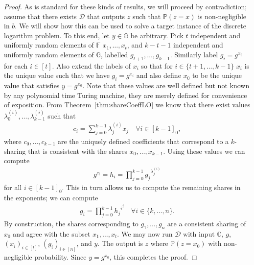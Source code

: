 \documentclass{article}
\newcommand{\seq}[1]{\left[#1\right]}
\newcommand{\seqZ}[1]{\left[#1\right]_0}
\theoremstyle{remark}
\newcommand{\F}{\mathbb{F}}
\newcommand{\G}{\mathbb{G}}
\renewcommand{\P}{\mathbb{P}}
\begin{document}
\begin{proof}
	As is standard for these kinds of results, we will proceed by
	contradiction; assume that there exists $\mathcal{D}$ that outputs $z$ such
	that $\P(z = x)$ is non-negligible in $b$. We will show how this can be
	used to solve a target instance of the discrete logarithm problem. To this
	end, let $y \in \G$ be arbitrary. Pick $t$ independent and uniformly random
	elements of $\F$ $x_1, \ldots, x_t$, and $k - t - 1$ independent and
	uniformly random elements of $\G$, labelled $g_{t+1}, \ldots, g_{k-1}$.
	Similarly label $g_i = g^{x_i}$ for each $i \in \seq{t}$. Also extend the
	labels of $x_i$ so that for $i \in \{t+1, \ldots, k-1\}$ $x_i$ is the
	unique value such that we have $g_i = g^{x_i}$ and also define $x_0$ to be
	the unique value that satisfies $y = g^{x_0}$. Note that these values are
	well defined but not known by any polynomial time Turing machine, they are
	merely defined for convenience of exposition. From
	Theorem~\ref{thm:shareCoeffLO} we know that there exist values
	$\lambda_0^{(i)}, \ldots, \lambda_{k-1}^{(i)}$ such that
	\begin{align*}
		c_i = \sum_{j=0}^{k-1} \lambda_j^{(i)} x_j
		\quad
		\forall i \in \seqZ{k-1},
	\end{align*}
	where $c_0, \ldots, c_{k-1}$ are the uniquely defined coefficients that
	correspond to a $k$-sharing that is consistent with the shares $x_0,
	\ldots, x_{k-1}$. Using these values we can compute
	\begin{align*}
		g^{c_i} = h_i = \prod_{j=0}^{k-1} {g_j}^{\lambda_j^{(i)}}
	\end{align*}
	for all $i \in \seqZ{k-1}$. This in turn allows us to compute the remaining
	shares in the exponents; we can compute
	\begin{align*}
		g_i = \prod_{j=0}^{k-1} {h_j}^{i^j}
		\quad
		\forall i \in \{k, \ldots, n\}.
	\end{align*}
	By construction, the shares corresponding to $g_1, \ldots, g_n$ are a
	consistent sharing of $x_0$ and agree with the subset $x_1, \ldots, x_t$.
	We may now run $\mathcal{D}$ with input $\G$, $g$, ${(x_i)}_{i \in
	\seq{t}}$, ${(g_i)}_{i \in \seq{n}}$, and $y$. The output is $z$ where
	$\P(z = x_0)$ with non-negligible probability. Since $y = g^{x_0}$, this
	completes the proof.
\end{proof}
\end{document}
